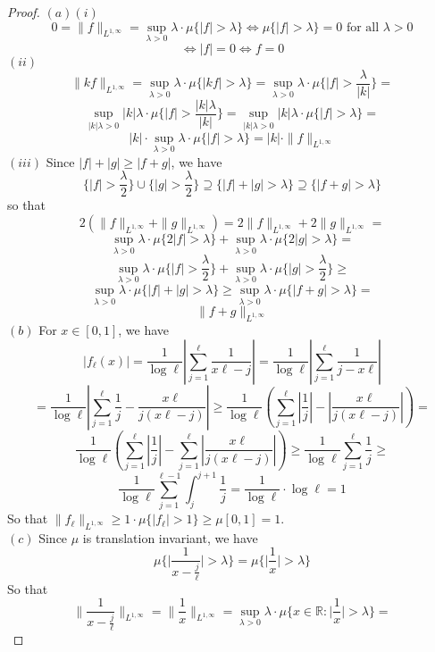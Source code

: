 \documentclass[12pt]{article}
\begin{document}
\begin{proof}
  $(a) (i)$
  $$0 = \|f\|_{L^{1, \infty}} = \sup_{\lambda > 0} \lambda \cdot \mu \{|f| > \lambda\} \iff \mu \{|f| > \lambda\} = 0 \text{ for all } \lambda > 0$$ $$\iff |f| = 0 \iff f = 0$$
  $(ii)$
  $$\|kf\|_{L^{1, \infty}} = \sup_{\lambda > 0} \lambda \cdot \mu \{|kf| > \lambda\} = \sup_{\lambda > 0} \lambda \cdot \mu \{|f| > \frac{\lambda}{|k|}\} =$$
  $$\sup_{|k|\lambda > 0} |k|\lambda \cdot \mu \{|f| > \frac{|k|\lambda}{|k|}\} = \sup_{|k|\lambda > 0} |k|\lambda \cdot \mu \{|f| > \lambda\} =$$
  $$|k| \cdot \sup_{\lambda > 0} \lambda \cdot \mu \{|f| > \lambda\} = |k| \cdot \|f\|_{L^{1, \infty}}$$
  $(iii)$ Since $|f| + |g| \ge |f + g|$, we have
  $$\{|f| > \dfrac{\lambda}{2}\} \cup \{|g| > \dfrac{\lambda}{2}\} \supseteq \{|f| + |g| > \lambda\} \supseteq \{|f+g| > \lambda\}$$
  so that
  $$2(\|f\|_{L^{1, \infty}} + \|g\|_{L^{1, \infty}}) = 2\|f\|_{L^{1, \infty}} + 2\|g\|_{L^{1, \infty}} =$$
  $$\sup_{\lambda > 0} \lambda \cdot \mu \{2|f| > \lambda\} + \sup_{\lambda > 0} \lambda \cdot \mu \{2|g| > \lambda\} = $$
  $$\sup_{\lambda > 0} \lambda \cdot \mu \{|f| > \dfrac{\lambda}{2}\} + \sup_{\lambda > 0} \lambda \cdot \mu \{|g| > \dfrac{\lambda}{2}\} \ge$$
  $$\sup_{\lambda > 0} \lambda \cdot \mu \{|f| + |g| > \lambda\} \ge \sup_{\lambda > 0} \lambda \cdot \mu \{|f + g| > \lambda\} =$$
  $$\|f + g\|_{L^{1, \infty}}$$
  $(b)$ For $x \in [0, 1]$, we  have
  $$|f_\ell(x)| = \dfrac{1}{\log \ell} |\sum_{j=1}^\ell \dfrac{1}{x \ell - j}| = \dfrac{1}{\log \ell} |\sum_{j=1}^\ell \dfrac{1}{j - x \ell}|$$
  $$= \dfrac{1}{\log \ell} |\sum_{j=1}^\ell \dfrac{1}{j} - \dfrac{x \ell}{j(x \ell - j)}| \ge \dfrac{1}{\log \ell}(\sum_{j=1}^\ell |\dfrac{1}{j}| - |\dfrac{x \ell}{j(x \ell - j)}|) =$$
  $$\dfrac{1}{\log \ell}(\sum_{j=1}^\ell |\dfrac{1}{j}| - \sum_{j=1}^\ell|\dfrac{x \ell}{j(x \ell - j)}|) \ge \dfrac{1}{\log \ell} \sum_{j=1}^\ell \dfrac{1}{j} \ge$$
  $$\dfrac{1}{\log \ell} \sum_{j=1}^{\ell - 1} \int_{j}^{j+1}\dfrac{1}{j} = \dfrac{1}{\log \ell} \cdot \log  \ell = 1$$
  So that $\|f_\ell \|_{L^{1, \infty}} \ge 1 \cdot \mu\{|f_\ell| > 1\} \ge \mu[0, 1] = 1$.\\
  $(c)$ Since $\mu$ is translation invariant, we have
  $$\mu \Bigg\{\Bigg | \dfrac{1}{x - \frac{j}{\ell}} \Bigg | > \lambda \Bigg\} = \mu \Bigg\{\Bigg |\dfrac{1}{x} \Bigg | > \lambda \Bigg\}$$
  So that
  $$\Bigg \|\dfrac{1}{x - \frac{j}{\ell}} \Bigg\|_{L^{1, \infty}} = \Bigg \|\dfrac{1}{x} \Bigg\|_{L^{1, \infty}} = \sup_{\lambda > 0} \lambda \cdot \mu \Big \{x \in \mathbb{R}: \Big| \frac{1}{x} \Big | > \lambda \Big \} =$$

\end{proof}
\end{document}
